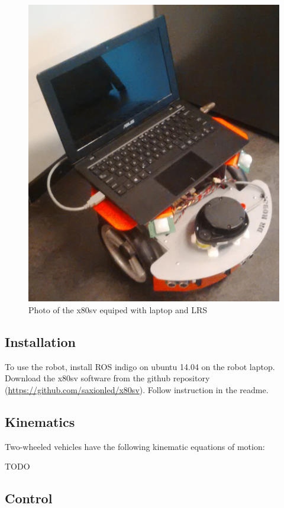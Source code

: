\documentclass[a4paper]{article}
\begin{document}
\begin{figure}[h!]
  \centering
  \includegraphics[width=\textwidth,height=\textheight,keepaspectratio]{img/fotorobot.png}
  \caption{Photo of the x80sv equiped with laptop and LRS}
\end{figure}

\subsection{Installation}

To use the robot, install ROS indigo on ubuntu 14.04 on the robot laptop. Download the 
x80sv software from the github repository (\url{https://github.com/saxionled/x80sv}). Follow 
instruction in the readme.

\subsection{Kinematics}

Two-wheeled vehicles have the following kinematic equations of motion:

TODO


\subsection{Control}
\end{document}
